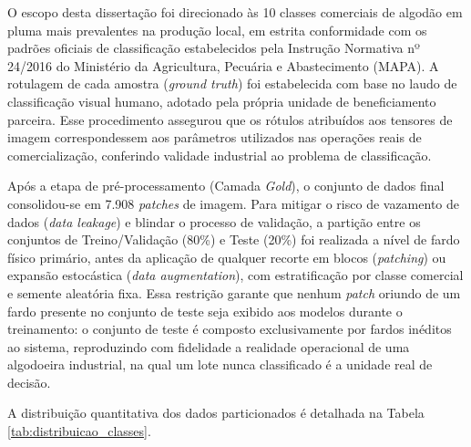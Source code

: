 
O escopo desta dissertação foi direcionado às 10 classes comerciais de algodão em pluma mais prevalentes na produção local, em estrita conformidade com os padrões oficiais de classificação estabelecidos pela Instrução Normativa nº 24/2016 do Ministério da Agricultura, Pecuária e Abastecimento (MAPA). A rotulagem de cada amostra (\textit{ground truth}) foi estabelecida com base no laudo de classificação visual humano, adotado pela própria unidade de beneficiamento parceira. Esse procedimento assegurou que os rótulos atribuídos aos tensores de imagem correspondessem aos parâmetros utilizados nas operações reais de comercialização, conferindo validade industrial ao problema de classificação.

Após a etapa de pré-processamento (Camada \textit{Gold}), o conjunto de dados final consolidou-se em 7.908 \textit{patches} de imagem. Para mitigar o risco de vazamento de dados (\textit{data leakage}) e blindar o processo de validação, a partição entre os conjuntos de Treino/Validação (80\%) e Teste (20\%) foi realizada a nível de fardo físico primário, antes da aplicação de qualquer recorte em blocos (\textit{patching}) ou expansão estocástica (\textit{data augmentation}), com estratificação por classe comercial e semente aleatória fixa. Essa restrição garante que nenhum \textit{patch} oriundo de um fardo presente no conjunto de teste seja exibido aos modelos durante o treinamento: o conjunto de teste é composto exclusivamente por fardos inéditos ao sistema, reproduzindo com fidelidade a realidade operacional de uma algodoeira industrial, na qual um lote nunca classificado é a unidade real de decisão.

A distribuição quantitativa dos dados particionados é detalhada na Tabela \ref{tab:distribuicao_classes}.

